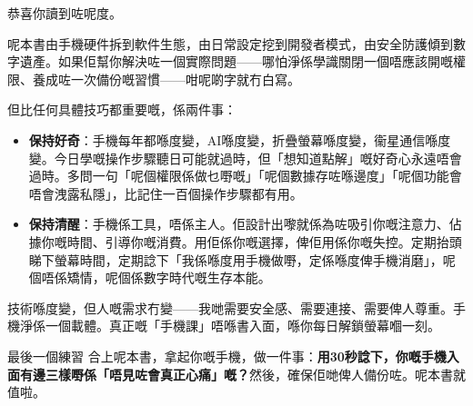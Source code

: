
恭喜你讀到咗呢度。

呢本書由手機硬件拆到軟件生態，由日常設定挖到開發者模式，由安全防護傾到數字遺產。如果佢幫你解決咗一個實際問題——哪怕淨係學識關閉一個唔應該開嘅權限、養成咗一次備份嘅習慣——咁呢啲字就冇白寫。

但比任何具體技巧都重要嘅，係兩件事：

\begin{itemize}
  \item \textbf{保持好奇}：手機每年都喺度變，AI喺度變，折疊螢幕喺度變，衞星通信喺度變。今日學嘅操作步驟聽日可能就過時，但「想知道點解」嘅好奇心永遠唔會過時。多問一句「呢個權限係做乜嘢嘅」「呢個數據存咗喺邊度」「呢個功能會唔會洩露私隱」，比記住一百個操作步驟都有用。
  \item \textbf{保持清醒}：手機係工具，唔係主人。佢設計出嚟就係為咗吸引你嘅注意力、佔據你嘅時間、引導你嘅消費。用佢係你嘅選擇，俾佢用係你嘅失控。定期抬頭睇下螢幕時間，定期諗下「我係喺度用手機做嘢，定係喺度俾手機消磨」，呢個唔係矯情，呢個係數字時代嘅生存本能。
\end{itemize}

技術喺度變，但人嘅需求冇變——我哋需要安全感、需要連接、需要俾人尊重。手機淨係一個載體。真正嘅「手機課」唔喺書入面，喺你每日解鎖螢幕嗰一刻。

\begin{tcbpractice}{最後一個練習}
合上呢本書，拿起你嘅手機，做一件事：\textbf{用30秒諗下，你嘅手機入面有邊三樣嘢係「唔見咗會真正心痛」嘅？}然後，確保佢哋俾人備份咗。呢本書就值啦。

\end{tcbpractice}
